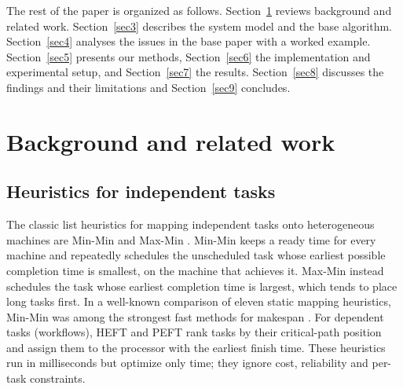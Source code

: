 \documentclass[pdflatex,sn-basic]{sn-jnl}
\theoremstyle{thmstyleone}%
\theoremstyle{thmstyletwo}%
\theoremstyle{thmstylethree}%
\begin{document}
The rest of the paper is organized as follows. Section~\ref{sec2} reviews background and related work. Section~\ref{sec3} describes the system model and the base algorithm. Section~\ref{sec4} analyses the issues in the base paper with a worked example. Section~\ref{sec5} presents our methods, Section~\ref{sec6} the implementation and experimental setup, and Section~\ref{sec7} the results. Section~\ref{sec8} discusses the findings and their limitations and Section~\ref{sec9} concludes.

\section{Background and related work}\label{sec2}
\subsection{Heuristics for independent tasks}\label{sec2.1}
The classic list heuristics for mapping independent tasks onto heterogeneous machines are Min-Min and Max-Min \citep{ibarra1977,maheswaran1999}. Min-Min keeps a ready time for every machine and repeatedly schedules the unscheduled task whose earliest possible completion time is smallest, on the machine that achieves it. Max-Min instead schedules the task whose earliest completion time is largest, which tends to place long tasks first. In a well-known comparison of eleven static mapping heuristics, Min-Min was among the strongest fast methods for makespan \citep{braun2001}. For dependent tasks (workflows), HEFT \citep{topcuoglu2002} and PEFT \citep{arabnejad2014} rank tasks by their critical-path position and assign them to the processor with the earliest finish time. These heuristics run in milliseconds but optimize only time; they ignore cost, reliability and per-task constraints.
\end{document}
